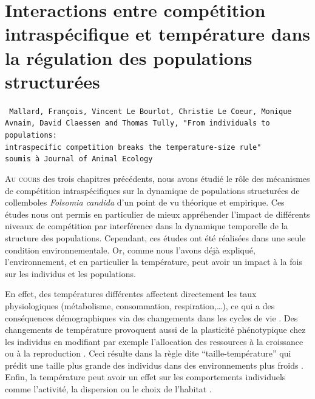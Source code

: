 \chapter{Interactions entre compétition intraspécifique et température dans la
régulation des populations structurées}
\label{chap:fip}

\vspace{2cm}
\begin{Spacing}{1}
\texttt{
Mallard, François, Vincent Le Bourlot, Christie Le Coeur, Monique Avnaim, David
Claessen and Thomas Tully, "From individuals to populations: \\intraspecific
competition breaks the temperature-size rule"\\
soumis à Journal of Animal Ecology}
\end{Spacing}
\vspace{2cm}


\lettrine[lines=3]{A}{u cours} des trois chapitres précédents, nous avons étudié
le rôle des mécanismes de compétition intraspécifiques sur la dynamique de
populations structurées de collemboles \textit{Folsomia candida} d'un point de vu théorique
et empirique. Ces études nous ont permis en particulier de mieux appréhender
l'impact de différents niveaux de compétition par interférence dans la
dynamique temporelle de la structure des populations. Cependant, ces études ont
été réalisées dans une seule condition environnementale. Or, comme nous
l'avons déjà expliqué, l'environnement, et en particulier la température, peut
avoir un impact à la fois sur les individus et les populations. 

En effet, des températures différentes affectent directement les taux
physiologiques (métabolisme, consommation, respiration,\ldots), ce qui a des
conséquences démographiques via des changements dans les cycles de vie
\autocites{gillooly2002a,le-galliard2012a}. Des changements de température
provoquent aussi de la plasticité phénotypique chez les individus en modifiant
par exemple l'allocation des ressources à la croissance ou à la reproduction
\autocites{liefting2010temperature,gutteling2007mapping}. Ceci résulte dans la
règle dite ``taille-température'' qui prédit une taille plus grande des
individus dans des environnements plus froids
\autocites{atkinson1994a,atkinson1996a,angilletta2009a}. Enfin, la température
peut avoir un effet sur les comportements individuels comme l'activité, la
dispersion ou le choix de l'habitat
\autocites{atacho2013a,bonte2008thermal,vanbeest2012temperature}.

